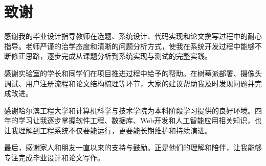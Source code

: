 \documentclass{heuthesis}
\begin{document}
\clearpage
\section*{\centering{}致\quad 谢}

感谢我的毕业设计指导教师在选题、系统设计、代码实现和论文撰写过程中的耐心指导。老师严谨的治学态度和清晰的问题分析方式，使我在系统开发过程中能够不断修正思路，逐步完成从课题分析到系统实现与测试的完整实践。

感谢实验室的学长和同学们在项目推进过程中给予的帮助。在树莓派部署、摄像头调试、用户注册流程和论文结构梳理等环节，大家的建议帮助我及时发现问题并完成改进。

感谢哈尔滨工程大学和计算机科学与技术学院为本科阶段学习提供的良好环境。四年的学习让我逐步掌握软件工程、数据库、Web开发和人工智能应用相关知识，也让我理解到工程系统不仅要能运行，更要能长期维护和持续演进。

最后，感谢家人和朋友一直以来的支持与鼓励。正是他们的理解和陪伴，让我能够专注完成毕业设计和论文写作。
\end{document}
